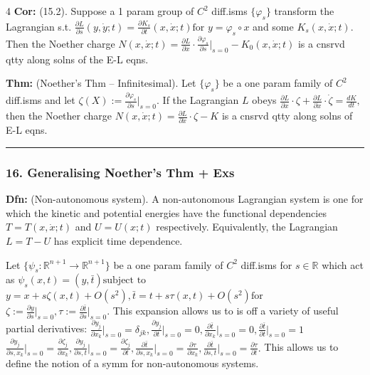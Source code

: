 \documentclass[landscape, 8pt]{extarticle}
\begin{document}
\begin{multicols*}{4}
		\textbf{Cor:} (15.2). Suppose a 1 param group of $C^2$ diff.isms $\{\varphi_s\}$ transform the Lagrangian s.t.
		$
		\frac{\partial L}{\partial s}(y,\dot{y};t)=\frac{\partial K_s}{\partial t}(x,\dot{x};t)\text{for }y=\varphi_s\circ x
		$
		and some $K_s(x,\dot{x};t)$. Then the Noether charge
		$
		N(x,\dot{x};t)=\frac{\partial L}{\partial\dot{x}}\cdot\frac{\partial\varphi_s}{\partial s}\bigg|_{s=0}-K_0(x,\dot{x};t)
		$
		is a cnsrvd qtty along solns of the E-L eqns.
		
		\textbf{Thm:} (Noether's Thm -- Infinitesimal). Let $\{\varphi_s\}$ be a one param family of $C^2$ diff.isms and let
		$
		\zeta(X):=\frac{\partial\varphi_s}{\partial s}\bigg|_{s=0}.
		$
		If the Lagrangian $L$ obeys
		$
		\frac{\partial L}{\partial x}\cdot\zeta+\frac{\partial L}{\partial\dot{x}}\cdot\dot\zeta=\frac{dK}{dt},
		$
		then the Noether charge
		$
		N(x,\dot{x};t)=\frac{\partial L}{\partial\dot{x}}\cdot\zeta-K
		$
		is a cnsrvd qtty along solns of E-L eqns.
		
		\hrule
		\vspace*{-3pt}
		\subsubsection*{\tiny{16. Generalising Noether's Thm + Exs}}
		\vspace*{-5pt}
		
		\textbf{Dfn:} (Non-autonomous system). A non-autonomous Lagrangian system is one for which the kinetic and potential energies have the functional dependencies $T=T(x,\dot{x};t)$ and $U=U(x;t)$ respectively. Equivalently, the Lagrangian $L=T-U$ has explicit time dependence.
		
		Let $\{\psi_s:\mathbb{R}^{n+1}\to\mathbb{R}^{n+1}\}$ be a one param family of $C^2$ diff.isms for $s\in\mathbb{R}$ which act as
		$
		\psi_s(x,t)=(y,\bar{t})\text{subject to}
		$
		$
		y=x+s\zeta(x,t)+O(s^2),\bar{t}=t+s\tau(x,t)+O(s^2)\text{for}
		$
		$
		\zeta:=\frac{\partial y}{\partial s}\bigg|_{s=0},\tau:=\frac{\partial\bar{t}}{\partial s}\bigg|_{s=0}.
		$
		This expansion allows us to is off a variety of useful partial derivatives:
		$
		\frac{\partial y_j}{\partial x_k}\bigg|_{s=0}=\delta_{jk}, \frac{\partial y_j}{\partial t}\bigg|_{s=0}=0, \frac{\partial\bar{t}}{\partial x_k}\bigg|_{s=0}=0, \frac{\partial\bar{t}}{\partial t}\bigg|_{s=0}=1
		$
		$
		\frac{\partial y_j}{\partial s,x_k}\bigg|_{s=0}=\frac{\partial\zeta_j}{\partial x_k}, \frac{\partial y_j}{\partial s,t}\bigg|_{s=0}=\frac{\partial\zeta_j}{\partial t}, \frac{\partial\bar{t}}{\partial s,x_k}\bigg|_{s=0}=\frac{\partial\tau}{\partial x_k}, \frac{\partial\bar{t}}{\partial s,t}\bigg|_{s=0}=\frac{\partial\tau}{\partial t}.
		$
		This allows us to define the notion of a symm for non-autonomous systems.
		

\end{multicols*}
\end{document}
